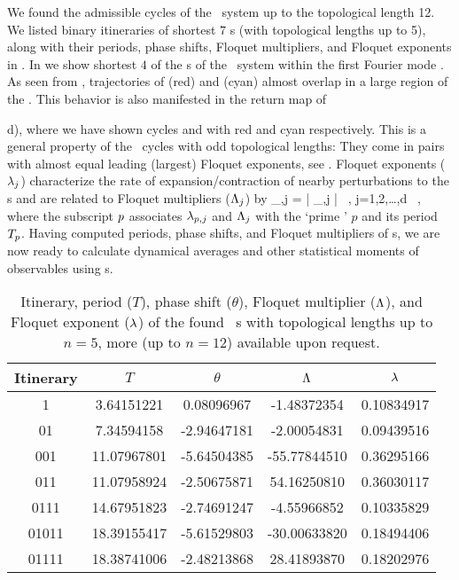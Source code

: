 \documentclass[aip,cha,
reprint,
secnumarabic,
nofootinbib, tightenlines,
nobibnotes, showkeys, showpacs,
superscriptaddress,
]{revtex4-1}
\begin{document}
We found the admissible cycles of the
\twomode\ system up to the topological length 12. We listed binary itineraries
of shortest $7$ \rpo s (with topological lengths up to 5), along with their
periods, phase shifts, Floquet multipliers, and Floquet exponents in
. In  we show shortest $4$ of
the \rpo s of the \twomode\ system within the first Fourier mode \slicePlane .
As seen from , trajectories of  (red) and
 (cyan) almost overlap in a large region of the \statesp . This
behavior is also manifested in the return map of
\,{d), where we have shown cycles  and
 with red and cyan respectively. This is a general property of the
\twomode\ cycles with odd topological lengths: They come in pairs with almost
equal leading (largest) Floquet exponents, see .
Floquet exponents ($\lambda_j$) characterize the rate of expansion/contraction
of nearby perturbations to the \rpo s and are related to Floquet multipliers
($\Lambda_j$) by
\beq
    \Lyap_{\rpprime,j} = 
                         \ln | \ExpaEig_{\rpprime,j} |
                         \, , \quad j=1,2,\dots,d \, ,
\eeq
where the subscript $p$ associates $\lambda_{p,j}$ and $\Lambda_j$
with the `prime \rpo' $p$ and its period
${T_{p}}$. Having computed periods, phase shifts,
and Floquet multipliers of \rpo s, we are now ready to calculate dynamical
averages and other statistical moments of observables using \cycForm s.

\begin{table}
	\caption{Itinerary, period ($T$), phase shift ($\theta$), 
			 Floquet multiplier ($\Lambda$), and Floquet exponent
			 ($\lambda$) of the found \twomode\ \rpo s with topological
			 lengths up to $n = 5$, more (up to $n=12$) available 
			 upon request.}
	\begin{tabular}{c|c|c|c|c}
	Itinerary & $T$ & $\theta$ & $\Lambda$ & $\lambda$ \\ 
	\hline
	1 & 3.64151221 & 0.08096967 & -1.48372354 &0.10834917 \\ 
	01 & 7.34594158 & -2.94647181 & -2.00054831 &0.09439516 \\ 
	001 & 11.07967801 & -5.64504385 & -55.77844510 &0.36295166 \\ 
	011 & 11.07958924 & -2.50675871 & 54.16250810 &0.36030117 \\ 
	0111 & 14.67951823 & -2.74691247 & -4.55966852 &0.10335829 \\ 
	01011 & 18.39155417 & -5.61529803 & -30.00633820 &0.18494406 \\ 
	01111 & 18.38741006 & -2.48213868 & 28.41893870 &0.18202976 \\ 
	\end{tabular}
	\label{t-rpofirst10}
\end{table}

}
\end{document}
